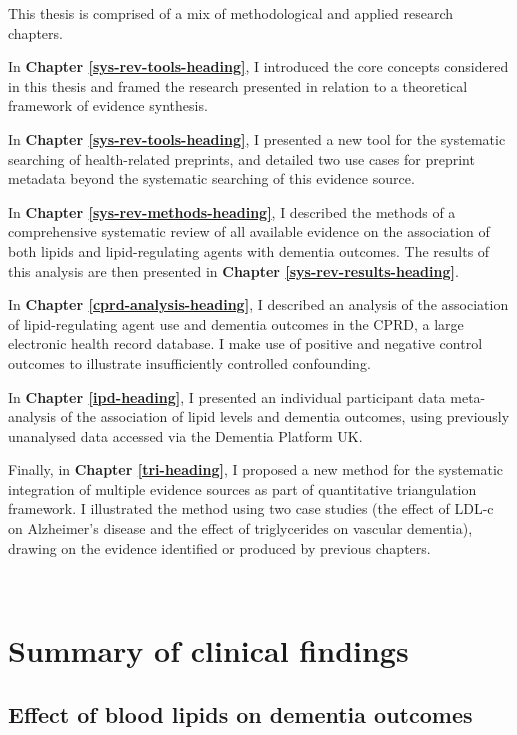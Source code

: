 \documentclass[a4paper, twoside]{templates/ociamthesis}
\begin{document}
This thesis is comprised of a mix of methodological and applied research chapters.

In \textbf{Chapter \ref{sys-rev-tools-heading}}, I introduced the core concepts considered in this thesis and framed the research presented in relation to a theoretical framework of evidence synthesis.

In \textbf{Chapter \ref{sys-rev-tools-heading}}, I presented a new tool for the systematic searching of health-related preprints, and detailed two use cases for preprint metadata beyond the systematic searching of this evidence source.

In \textbf{Chapter \ref{sys-rev-methods-heading}}, I described the methods of a comprehensive systematic review of all available evidence on the association of both lipids and lipid-regulating agents with dementia outcomes. The results of this analysis are then presented in \textbf{Chapter \ref{sys-rev-results-heading}}.

In \textbf{Chapter \ref{cprd-analysis-heading}}, I described an analysis of the association of lipid-regulating agent use and dementia outcomes in the CPRD, a large electronic health record database. I make use of positive and negative control outcomes to illustrate insufficiently controlled confounding.

In \textbf{Chapter \ref{ipd-heading}}, I presented an individual participant data meta-analysis of the association of lipid levels and dementia outcomes, using previously unanalysed data accessed via the Dementia Platform UK.

Finally, in \textbf{Chapter \ref{tri-heading}}, I proposed a new method for the systematic integration of multiple evidence sources as part of quantitative triangulation framework. I illustrated the method using two case studies (the effect of LDL-c on Alzheimer's disease and the effect of triglycerides on vascular dementia), drawing on the evidence identified or produced by previous chapters.

~

\hypertarget{summary-of-clinical-findings}{%
\section{Summary of clinical findings}\label{summary-of-clinical-findings}}

\hypertarget{effect-of-blood-lipids-on-dementia-outcomes}{%
\subsection{Effect of blood lipids on dementia outcomes}\label{effect-of-blood-lipids-on-dementia-outcomes}}
\end{document}
